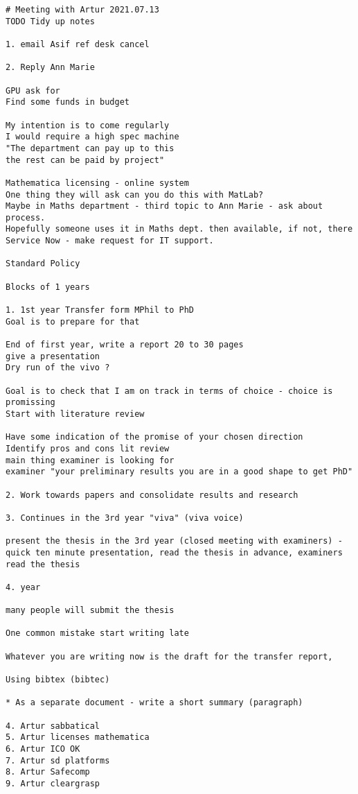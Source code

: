 %
\begin{verbatim}
# Meeting with Artur 2021.07.13
TODO Tidy up notes

1. email Asif ref desk cancel

2. Reply Ann Marie

GPU ask for
Find some funds in budget

My intention is to come regularly
I would require a high spec machine
"The department can pay up to this
the rest can be paid by project"

Mathematica licensing - online system
One thing they will ask can you do this with MatLab?
Maybe in Maths department - third topic to Ann Marie - ask about process.
Hopefully someone uses it in Maths dept. then available, if not, there
Service Now - make request for IT support.

Standard Policy

Blocks of 1 years

1. 1st year Transfer form MPhil to PhD
Goal is to prepare for that

End of first year, write a report 20 to 30 pages
give a presentation
Dry run of the vivo ?

Goal is to check that I am on track in terms of choice - choice is promissing
Start with literature review

Have some indication of the promise of your chosen direction
Identify pros and cons lit review
main thing examiner is looking for
examiner "your preliminary results you are in a good shape to get PhD"

2. Work towards papers and consolidate results and research

3. Continues in the 3rd year "viva" (viva voice)

present the thesis in the 3rd year (closed meeting with examiners) - quick ten minute presentation, read the thesis in advance, examiners read the thesis

4. year

many people will submit the thesis

One common mistake start writing late

Whatever you are writing now is the draft for the transfer report,

Using bibtex (bibtec)

* As a separate document - write a short summary (paragraph)

4. Artur sabbatical
5. Artur licenses mathematica
6. Artur ICO OK
7. Artur sd platforms
8. Artur Safecomp
9. Artur cleargrasp



\end{verbatim}
